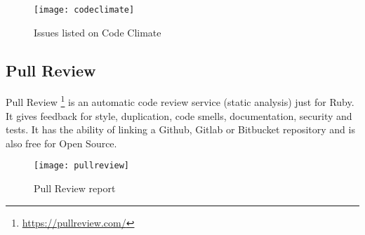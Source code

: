 \begin{figure}[H]
    \begin{center}
        \texttt{[image: codeclimate]}
        \caption{Issues listed on Code Climate}
        \label{figure:codeclimate}
    \end{center}
\end{figure}

\subsection{Pull Review}
Pull Review \footnote{\url{https://pullreview.com/}} is an automatic code review service (static analysis) just for Ruby. It gives feedback for style, duplication, code smells, documentation, security and tests. It has the ability of linking a Github, Gitlab or Bitbucket repository and is also free for Open Source.

\begin{figure}[H]
    \begin{center}
        \texttt{[image: pullreview]}
        \caption{Pull Review report}
        \label{figure:pullreview}
    \end{center}
\end{figure}


